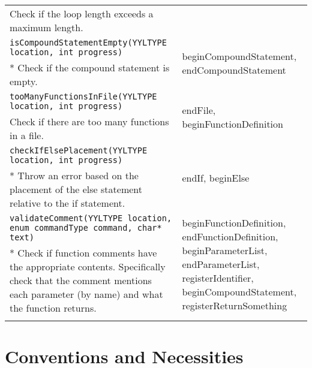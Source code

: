 \documentclass[12pt]{report}
\newcommand{\todoin}{\todo[inline]}
\begin{document}
\begin{longtable}{p{10cm} p{\saxColSize}}
			Check if the loop length exceeds a maximum length. \vspace{\vertSize} \\
		\lstinline!isCompoundStatementEmpty(YYLTYPE location, int progress)!  & \multirow{2}{\saxColSize}{beginCompoundStatement, endCompoundStatement} \\ *
			Check if the compound statement is empty. \vspace{\vertSize} \\
		\lstinline!tooManyFunctionsInFile(YYLTYPE location, int progress)! & \multirow{2}{\saxColSize}{endFile, beginFunctionDefinition} \\*
			 Check if there are too many functions in a file. \vspace{\vertSize} \\
		\lstinline!checkIfElsePlacement(YYLTYPE location, int progress)! & \multirow{2}{\saxColSize}{endIf, beginElse} \\ *
			Throw an error based on the placement of the else statement relative to the if statement.  \vspace{\vertSize} \\
		\lstinline!validateComment(YYLTYPE location, enum commandType command, char* text)! & \multirow{2}{\saxColSize}{beginFunctionDefinition, endFunctionDefinition, beginParameterList, endParameterList, registerIdentifier, beginCompoundStatement, registerReturnSomething} \\ *
			Check if function comments have the appropriate contents. Specifically check that the comment mentions each parameter (by name) and what the function returns. \vspace{\vertSize} \\

\vspace{1mm}
\end{longtable}


\chapter{Conventions and Necessities}
\label{conventions}

\todoin{DynArray uses}
\end{document}
